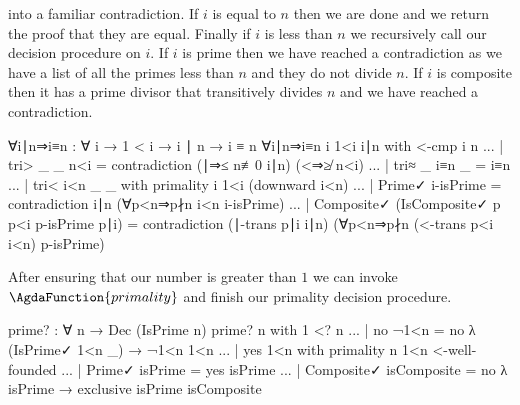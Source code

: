 \documentclass[./Thesis.tex]{subfiles}
\begin{document}
into a familiar contradiction. If $i$ is equal to $n$ then we are done and we
return the proof that they are equal. Finally if $i$ is less than $n$ we
recursively call our decision procedure on $i$. If $i$ is prime then we have
reached a contradiction as we have a list of all the primes less than $n$ and
they do not divide $n$. If $i$ is composite then it has a prime divisor that
transitively divides $n$ and we have reached a contradiction.
\begin{code}
    ∀i∣n⇒i≡n : ∀ {i} → 1 < i → i ∣ n → i ≡ n
    ∀i∣n⇒i≡n {i} 1<i i∣n with <-cmp i n
    ... | tri> _ _ n<i = contradiction (∣⇒≤ n≢0 i∣n) (<⇒≱ n<i)
    ... | tri≈ _ i≡n _ = i≡n
    ... | tri< i<n _ _ with primality i 1<i (downward i<n)
    ...   | Prime✓ i-isPrime
          = contradiction i∣n (∀p<n⇒p∤n i<n i-isPrime)
    ...   | Composite✓ (IsComposite✓ p p<i p-isPrime p∣i)
          = contradiction (∣-trans p∣i i∣n) (∀p<n⇒p∤n (<-trans p<i i<n) p-isPrime)
\end{code}
After ensuring that our number is greater than $1$ we can invoke
$\AgdaFunction{primality}$ and finish our primality decision procedure.
\begin{code}
  prime? : ∀ n → Dec (IsPrime n)
  prime? n with 1 <? n
  ... | no ¬1<n = no λ { (IsPrime✓ 1<n _) → ¬1<n 1<n }
  ... | yes 1<n with primality n 1<n <-well-founded
  ... | Prime✓ isPrime = yes isPrime
  ... | Composite✓ isComposite = no λ { isPrime → exclusive isPrime isComposite }
\end{code}
\end{document}
